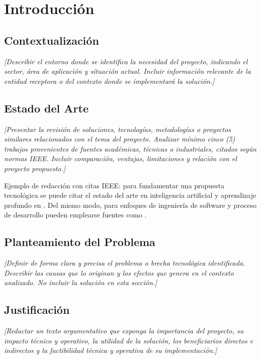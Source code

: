 \chapter{Introducción}
\label{chap:introduccion}

\section{Contextualización}
\textit{[Describir el entorno donde se identifica la necesidad del proyecto, indicando el sector, área de aplicación y situación actual. Incluir información relevante de la entidad receptora o del contexto donde se implementará la solución.]}


\section{Estado del Arte}
\textit{[Presentar la revisión de soluciones, tecnologías, metodologías o proyectos similares relacionados con el tema del proyecto. Analizar mínimo cinco (5) trabajos provenientes de fuentes académicas, técnicas o industriales, citados según normas IEEE. Incluir comparación, ventajas, limitaciones y relación con el proyecto propuesto.]}

Ejemplo de redacción con citas IEEE: para fundamentar una propuesta tecnológica se puede citar el estado del arte en inteligencia artificial y aprendizaje profundo en \cite{vaswani2017attention,goodfellow2016deep}. Del mismo modo, para enfoques de ingeniería de software y proceso de desarrollo pueden emplearse fuentes como \cite{sommerville2016software,boehm1988spiral}.

\section{Planteamiento del Problema}
\textit{[Definir de forma clara y precisa el problema o brecha tecnológica identificada. Describir las causas que lo originan y los efectos que genera en el contexto analizado. No incluir la solución en esta sección.]}

\section{Justificación}
\textit{[Redactar un texto argumentativo que exponga la importancia del proyecto, su impacto técnico y operativo, la utilidad de la solución, los beneficiarios directos e indirectos y la factibilidad técnica y operativa de su implementación.]}

